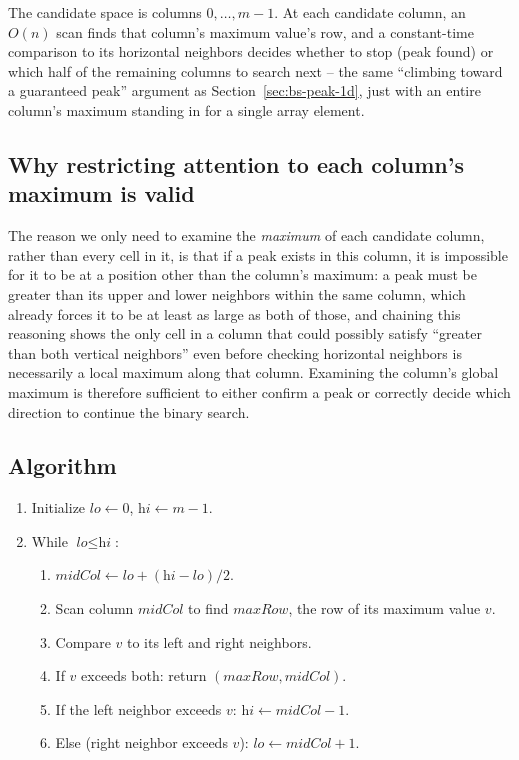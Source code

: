 \begin{ideabox}
The candidate space is columns $0, \dots, m-1$. At each candidate column,
an $O(n)$ scan finds that column's maximum value's row, and a constant-time
comparison to its horizontal neighbors decides whether to stop (peak
found) or which half of the remaining columns to search next -- the same
``climbing toward a guaranteed peak'' argument as
Section~\ref{sec:bs-peak-1d}, just with an entire column's maximum
standing in for a single array element.
\end{ideabox}

\subsection*{Why restricting attention to each column's maximum is valid}

The reason we only need to examine the \emph{maximum} of each candidate
column, rather than every cell in it, is that if a peak exists in this
column, it is impossible for it to be at a position other than the
column's maximum: a peak must be greater than its upper and lower
neighbors within the same column, which already forces it to be at least
as large as both of those, and chaining this reasoning shows the only cell
in a column that could possibly satisfy ``greater than both vertical
neighbors'' even before checking horizontal neighbors is necessarily a
local maximum along that column. Examining the column's global maximum is
therefore sufficient to either confirm a peak or correctly decide which
direction to continue the binary search.

\subsection*{Algorithm}

\begin{enumerate}
  \item Initialize $\textit{lo} \gets 0$, $\textit{hi} \gets m-1$.
  \item While $\textit{lo} \le \textit{hi}$:
  \begin{enumerate}
    \item $\textit{midCol} \gets \textit{lo}+(\textit{hi}-\textit{lo})/2$.
    \item Scan column $\textit{midCol}$ to find $\textit{maxRow}$, the row
          of its maximum value $v$.
    \item Compare $v$ to its left and right neighbors.
    \item If $v$ exceeds both: return $(\textit{maxRow},
          \textit{midCol})$.
    \item If the left neighbor exceeds $v$: $\textit{hi} \gets
          \textit{midCol}-1$.
    \item Else (right neighbor exceeds $v$): $\textit{lo} \gets
          \textit{midCol}+1$.
  \end{enumerate}
\end{enumerate}

